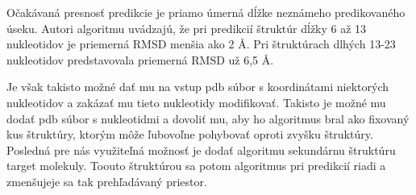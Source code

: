 \indent Očakávaná presnosť predikcie je priamo úmerná dĺžke neznámeho predikovaného úseku. Autori algoritmu uvádzajú, že pri predikcií štruktúr dĺžky 6 až 13 nukleotidov je priemerná RMSD menšia ako 2 Å. Pri štruktúrach dlhých 13-23 nukleotidov predstavovala priemerná RMSD už 6,5 Å.


\indent Je však takisto možné dať mu na vstup pdb súbor s koordinátami niektorých nukleotidov a zakázať mu tieto nukleotidy modifikovať. 
Takisto je možné mu dodať pdb súbor s nukleotidmi a dovoliť mu, aby ho algoritmus bral ako fixovaný kus štruktúry, ktorým môže ľubovoľne  pohybovať  oproti zvyšku štruktúry.
Posledná pre nás využiteľná možnosť je dodať algoritmu sekundárnu štruktúru target molekuly. Toouto štruktúrou sa potom algoritmus pri predikcií riadi a zmenšujeje sa tak prehľadávaný priestor.

